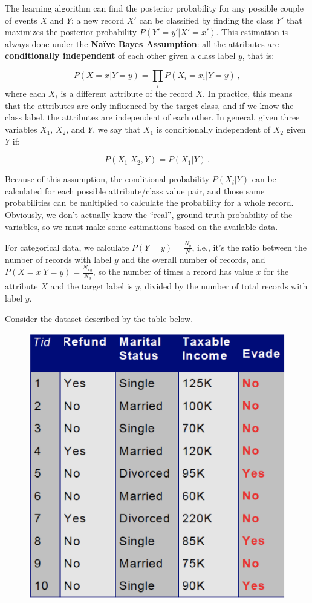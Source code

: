 The learning algorithm can find the posterior probability for any possible couple of events $X$ and $Y$; a new record $X'$ can be classified by finding the class $Y'$ that maximizes the posterior probability $P(Y'=y'|X'=x')$. This estimation is always done under the \textbf{Naïve Bayes Assumption}: all the attributes are \textbf{conditionally independent} of each other given a class label $y$, that is:

\begin{equation*}
    P(X=x|Y=y) = \prod_i P(X_i = x_i|Y=y) \, ,
\end{equation*}
where each $X_i$ is a different attribute of the record $X$. In practice, this means that the attributes are only influenced by the target class, and if we know the class label, the attributes are independent of each other. In general, given three variables $X_1$, $X_2$, and $Y$, we say that $X_1$ is conditionally independent of $X_2$ given $Y$ if:

\begin{equation*}
    P(X_1 | X_2,Y) = P(X_1|Y) \, .
\end{equation*}

Because of this assumption, the conditional probability $P(X_i | Y)$ can be calculated for each possible attribute/class value pair, and those same probabilities can be multiplied to calculate the probability for a whole record. Obviously, we don't actually know the ``real'', ground-truth probability of the variables, so we must make some estimations based on the available data.

For categorical data, we calculate $P(Y=y) = \frac{N_y}{N}$, i.e., it's the ratio between the number of records with label $y$ and the overall number of records, and $P(X=x|Y=y) = \frac{N_{xy}}{N_y}$, so the number of times a record has value $x$ for the attribute $X$ and the target label is $y$, divided by the number of total records with label $y$.

Consider the dataset described by the table below.
\begin{figure}[h]
    \centering
    \includegraphics[width=0.5\linewidth]{img/NBC.png} 
\end{figure}

